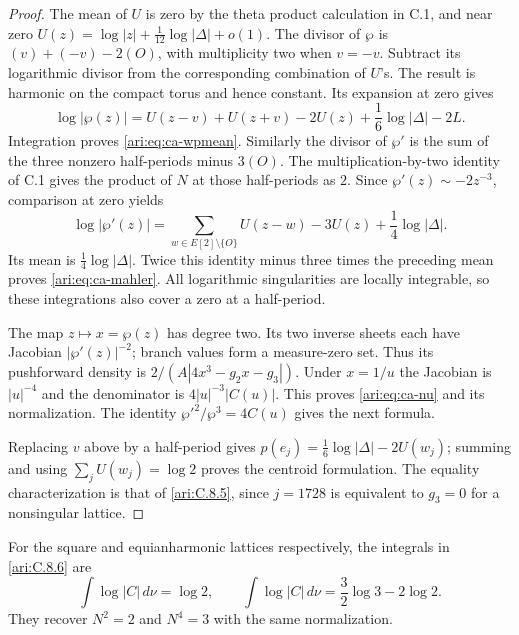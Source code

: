 \begin{proof}
The mean of $U$ is zero by the theta product calculation in C.1,
and near zero
$U(z)=\log|z|+\frac1{12}\log|\Delta|+o(1)$.
The divisor of $\wp$ is $(v)+(-v)-2(O)$, with multiplicity
two when $v=-v$. Subtract its logarithmic divisor from the
corresponding combination of $U$'s. The result is harmonic
on the compact torus and hence constant. Its expansion at
zero gives
\[
 \log|\wp(z)|=U(z-v)+U(z+v)-2U(z)
                  +\frac16\log|\Delta|-2L.
\]
Integration proves \eqref{ari:eq:ca-wpmean}.
Similarly the divisor of $\wp'$ is the sum of the three
nonzero half-periods minus $3(O)$. The multiplication-by-two
identity of C.1 gives the product of $N$ at those half-periods
as $2$. Since $\wp'(z)\sim-2z^{-3}$, comparison at zero yields
\[
 \log|\wp'(z)|=\sum_{w\in E[2]\setminus\{O\}}U(z-w)-3U(z)
                         +\frac14\log|\Delta|.
\]
Its mean is $\frac14\log|\Delta|$. Twice this identity minus
three times the preceding mean proves \eqref{ari:eq:ca-mahler}.
All logarithmic singularities are locally integrable, so these
integrations also cover a zero at a half-period.

The map $z\mapsto x=\wp(z)$ has degree two. Its two inverse
sheets each have Jacobian $|\wp'(z)|^{-2}$; branch values form
a measure-zero set. Thus its pushforward density is
$2/(A|4x^3-g_2x-g_3|)$. Under $x=1/u$ the Jacobian is
$|u|^{-4}$ and the denominator is $4|u|^{-3}|C(u)|$.
This proves \eqref{ari:eq:ca-nu} and its normalization. The identity
$\wp'^2/\wp^3=4C(u)$ gives the next formula.

Replacing $v$ above by a half-period gives
$p(e_j)=\frac16\log|\Delta|-2U(w_j)$; summing and using
$\sum_jU(w_j)=\log2$ proves the centroid formulation.
The equality characterization is that of \ref{ari:C.8.5},
since $j=1728$ is equivalent to $g_3=0$ for a nonsingular lattice.
\end{proof}

\begin{proposition}\label{ari:C.8.7}
For the square and equianharmonic lattices respectively, the
integrals in \ref{ari:C.8.6} are
\[
 \int\log|C|\,d\nu=\log2,\qquad
 \int\log|C|\,d\nu=\frac32\log3-2\log2.
\]
They recover $N^2=2$ and $N^4=3$ with the same normalization.
\end{proposition}

